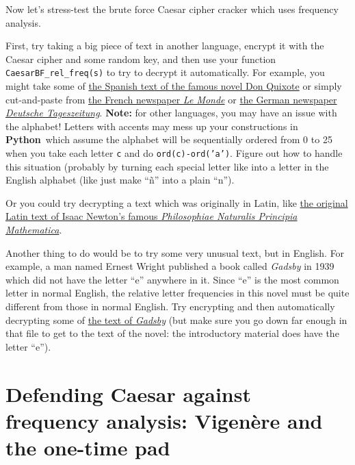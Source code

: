 \documentclass[12pt,letterpaper]{amsbook}
\theoremstyle{definition}
\theoremstyle{remark}
\numberwithin{figure}{section}
\numberwithin{exercise}{chapter}
\numberwithin{section}{chapter}
\numberwithin{equation}{section}
\numberwithin{table}{subsection}
\newcommand{\code}[1]{\colorbox{lg}{\texttt{#1}}}
\newcommand{\Python}{{\textbf{\ix{Python}}}}
\newcommand{\bhref}[2]{\href{#1}{#2}}
\newcommand{\ix}[1]{{#1}\index{#1}}
\begin{document}
\vskip4mm
\begin{BTtcb}[label=bt:stresstestCaesarBF_rel_freqs]{}{}
  Now let's stress-test the brute force Caesar cipher
  cracker which uses frequency analysis.

  \vskip2mm
  First, try taking a big piece of text in another language, encrypt it
  with the Caesar cipher and some random key, and then use your function
  \code{CaesarBF\_rel\_freq(s)} to try to decrypt it automatically.  For
  example, you might take some of \bhref{https://www.gutenberg.org/files/2000/2000-0.txt}{the Spanish text of the famous novel Don Quixote} or simply
  cut-and-paste from
  \bhref{https://www.lemonde.fr/}{the French newspaper \textit{Le Monde}} or
  \bhref{https://www.deutschetageszeitung.de/}{the German newspaper \textit{Deutsche Tageszeitung}}. 
\textbf{Note:} for other languages, you may have an issue
  with the alphabet!  Letters with accents may mess up your constructions in
  \Python\ which assume the alphabet will be sequentially ordered from 0 to 25
  when you take each letter \code{c} and do \code{ord(c)-ord('a')}.
  Figure out how to handle this situation (probably by turning each special
  letter like into a letter in the English alphabet (like just make  ``\~{n}''
  into a plain ``n'').

  \vskip2mm
  Or you could try decrypting a text which was originally in Latin, like
  \bhref{https://www.gutenberg.org/cache/epub/28233/pg28233.txt}{the original
  Latin text of Isaac Newton's famous \textit{Philosophiae Naturalis Principia}}
  \bhref{https://www.gutenberg.org/cache/epub/28233/pg28233.txt}{\textit{Mathematica}}.

  \vskip2mm
  Another thing to do would be to try some very unusual text, but in English.
  For example, a man named Ernest Wright published a book called \textit{Gadsby}
  in 1939 which did not have the letter ``e'' anywhere in it.  Since ``e'' is
  the most common letter in normal English, the relative letter frequencies in
  this novel must be quite different from those in normal English.  Try
  encrypting and then automatically decrypting some of \bhref{https://www.gutenberg.org/cache/epub/47342/pg47342.txt}{the text of
  \textit{Gadsby}} (but make sure you go down far enough in that file to get
  to the text of the novel: the introductory material does have the letter
  ``e'').
\end{BTtcb}

\vfill
\pagebreak
\section{Defending Caesar against frequency analysis: Vigen\`ere
and the one-time pad}
\label{sec:DCafaVatotp}
\end{document}
